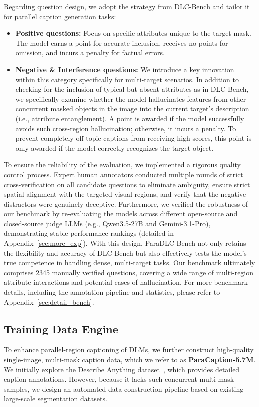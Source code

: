 \documentclass{llmxive}
\begin{document}
Regarding question design, we adopt the strategy from DLC-Bench and tailor it for parallel caption generation tasks:
\begin{itemize}
    \item \textbf{Positive questions:} Focus on specific attributes unique to the target mask. The model earns a point for accurate inclusion, receives no points for omission, and incurs a penalty for factual errors.
    \item \textbf{Negative \& Interference questions:} We introduce a key innovation within this category specifically for multi-target scenarios. In addition to checking for the inclusion of typical but absent attributes as in DLC-Bench, we specifically examine whether the model hallucinates features from other concurrent masked objects in the image into the current target's description (i.e., attribute entanglement). A point is awarded if the model successfully avoids such cross-region hallucination; otherwise, it incurs a penalty. To prevent completely off-topic captions from receiving high scores, this point is only awarded if the model correctly recognizes the target object.
\end{itemize}

To ensure the reliability of the evaluation, we implemented a rigorous quality control process. Expert human annotators conducted multiple rounds of strict cross-verification on all candidate questions to eliminate ambiguity, ensure strict spatial alignment with the targeted visual regions, and verify that the negative distractors were genuinely deceptive. Furthermore, we verified the robustness of our benchmark by re-evaluating the models across different open-source and closed-source judge LLMs (e.g., Qwen3.5-27B and Gemini-3.1-Pro), demonstrating stable performance rankings (detailed in Appendix~\ref{sec:more_exp}).
%
With this design, ParaDLC-Bench not only retains the flexibility and accuracy of DLC-Bench but also effectively tests the model's true competence in handling dense, multi-target tasks. 
%
Our benchmark ultimately comprises 2345 manually verified questions, covering a wide range of multi-region attribute interactions and potential cases of hallucination.
%
For more benchmark details, including the annotation pipeline and statistics, please refer to Appendix~\ref{sec:detail_bench}.

\vspace{-2mm}
\subsection{Training Data Engine}
To enhance parallel-region captioning of DLMs, we further construct high-quality single-image, multi-mask caption data, which we refer to as \textbf{ParaCaption-5.7M}.
%
We initially explore the Describe Anything dataset~\citep{lian2025describe}, which provides detailed caption annotations. 
%
However, because it lacks such concurrent multi-mask samples, we design an automated data construction pipeline based on existing large-scale segmentation datasets.
\end{document}
